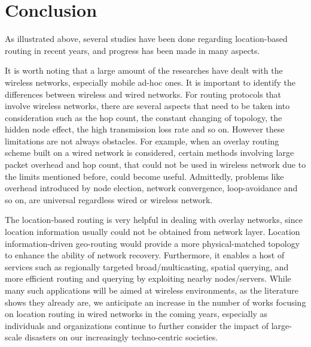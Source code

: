 \documentclass[conference]{IEEEtran}
\begin{document}

\section{Conclusion}
\label{conclusion}
As illustrated above, several studies have been done regarding location-based routing in recent years, and progress has been made in many aspects. 

It is worth noting that a large amount of the researches have dealt with the wireless networks, especially mobile ad-hoc ones. It is important to identify the differences between wireless and wired networks. For routing protocols that involve wireless networks, there are several aspects that need to be taken into consideration
such as the hop count, the constant changing of topology, the hidden node effect, the high transmission loss rate and so on. However these limitations are not always obstacles. For example, when an overlay routing scheme built on a wired network is considered, certain methods involving large packet overhead and hop count, that could not be used in wireless network due to the limits mentioned before, could become useful.  Admittedly, problems like overhead introduced by node election, network convergence, loop-avoidance and so on, are universal regardless wired or wireless network. 

The location-based routing is very helpful in dealing with overlay networks, since location information usually could not be obtained from network layer. Location information-driven geo-routing would provide a more physical-matched topology to enhance the ability of network recovery.
Furthermore, it enables a host of services such as regionally targeted broad/multicasting, spatial querying, and more efficient routing and querying by exploiting nearby nodes/servers.
While many such applications will be aimed at wireless environments, as the literature shows they already are, we anticipate an increase in the number of works focusing on location routing in wired networks in the coming years, especially as individuals and organizations continue to further consider the impact of large-scale disasters on our increasingly techno-centric societies.
\end{document}
